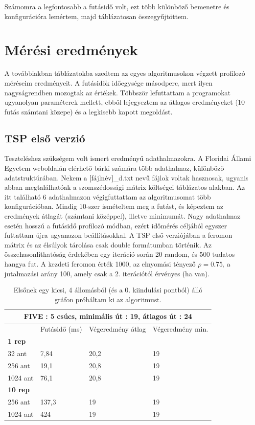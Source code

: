 Számomra a legfontosabb a futásidő volt, ezt több különböző bemenetre és konfigurációra lemértem, majd táblázatosan összegyűjtöttem.

\section{Mérési eredmények}

A továbbiakban táblázatokba szedtem az egyes algoritmusokon végzett profilozó méréseim eredményeit. A futásidők időegysége másodperc, mert ilyen nagyságrendben mozogtak az értékek. Többször lefuttattam a programokat ugyanolyan paraméterek mellett, ebből lejegyeztem az átlagos eredményeket (10 futás számtani közepe) és a legkisebb kapott megoldást.

\subsection{TSP első verzió}

Teszteléshez szükségem volt ismert eredményű adathalmazokra. A Floridai Állami Egyetem weboldalán \cite{TSPdataset} elérhető bárki számára több adathalmaz, különböző adatstruktúrában. Nekem a [fájlnév]\_d.txt nevű fájlok voltak hasznosak, ugyanis abban megtalálhatóak a szomszédossági mátrix költségei táblázatos alakban. Az itt található 6 adathalmazon végigfuttattam az algoritmusomat több konfigurációban. Mindig 10-szer ismételtem meg a futást, és képeztem az eredmények átlagát (számtani középpel), illetve minimumát. Nagy adathalmaz esetén hosszú a futásidő profilozó módban, ezért időmérés céljából egyszer futtattam újra ugyanazon beállításokkal. A TSP első verziójában a feromon mátrix és az élsúlyok tárolása csak double formátumban történik. Az összehasonlíthatóság érdekében egy iteráció során 20 random, és 500 tudatos hangya fut. A kezdeti feromon érték 1000, az elnyomási tényező \( \rho = 0.75 \), a jutalmazási arány 100, amely csak a 2. iterációtól érvényes (ha van).



\begin{table}[ht!]
	\centering
	\begin{tabular}{|p{2cm}||p{3cm}|p{3.5cm}|p{3.5cm}|}
		\hline
		\multicolumn{4}{|c|}{FIVE : 5 csúcs, minimális út : 19, átlagos út : 24} \\
		\hline
		& Futásidő (ms) & Végeredmény átlag & Végeredmény min.\\
		\hline
		\textbf{1 rep} & & &\\
		32 ant& 7,84 & 20,2 & 19\\
		256 ant & 19,1 & 20,8 & 19\\
		1024 ant & 76,1 &	20,8 &	19\\
		\hline
		\textbf{10 rep} & & &\\
		256 ant & 137,3 & 19 &	19\\
		1024 ant & 424 &	19 &	19\\
		\hline
	\end{tabular}
	\caption{Elsőnek egy kicsi, 4 állomásból (és a 0. kiindulási pontból) álló gráfon próbáltam ki az algoritmust.}
	\label{table:TSPv1_5}
\end{table}

